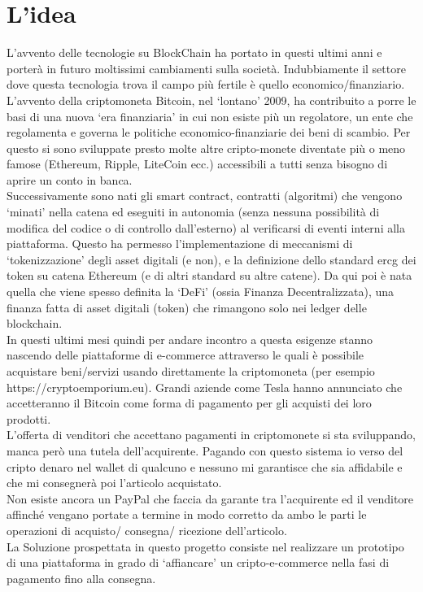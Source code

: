 \section{L'idea}
L’avvento delle tecnologie su BlockChain ha portato in questi ultimi anni e porterà in futuro moltissimi cambiamenti sulla società. Indubbiamente il settore dove questa tecnologia trova il campo più fertile è quello economico/finanziario. L’avvento della criptomoneta Bitcoin, nel ‘lontano’ 2009, ha contribuito a porre le basi di una nuova ‘era finanziaria’ in cui non esiste più un regolatore, un ente che regolamenta e governa le politiche economico-finanziarie dei beni di scambio. Per questo si sono sviluppate presto molte altre cripto-monete diventate più o meno famose (Ethereum, Ripple, LiteCoin ecc.) accessibili a tutti senza bisogno di aprire un conto in banca.\\
Successivamente sono nati gli smart contract, contratti (algoritmi) che vengono ‘minati’ nella catena ed eseguiti in autonomia (senza nessuna possibilità di modifica del codice o di controllo dall’esterno) al verificarsi di eventi interni alla piattaforma. Questo ha permesso l’implementazione di meccanismi di ‘tokenizzazione’ degli asset digitali (e non), e la definizione dello standard \gls{ercg} dei token su catena Ethereum (e di altri standard su altre catene). Da qui poi è nata quella che viene spesso definita la ‘DeFi’ (ossia Finanza Decentralizzata), una finanza fatta di asset digitali (token) che rimangono solo nei ledger delle blockchain.\\
In questi ultimi mesi quindi per andare incontro a questa esigenze stanno nascendo delle piattaforme di e-commerce attraverso le quali è possibile acquistare beni/servizi usando direttamente la criptomoneta (per esempio https://cryptoemporium.eu). Grandi aziende come Tesla hanno annunciato che accetteranno il Bitcoin come forma di pagamento per gli acquisti dei loro prodotti.\\
L’offerta di venditori che accettano pagamenti in criptomonete si sta sviluppando, manca però una tutela dell’acquirente. Pagando con questo sistema io verso del cripto denaro nel wallet di qualcuno e nessuno mi garantisce che sia affidabile e che mi consegnerà poi l’articolo acquistato.\\
Non esiste ancora un PayPal che faccia da garante tra l’acquirente ed il venditore affinché vengano portate a termine in modo corretto da ambo le parti le operazioni di acquisto/ consegna/ ricezione dell’articolo.\\
La Soluzione prospettata in questo progetto consiste nel realizzare un prototipo di una piattaforma in grado di ‘affiancare’ un cripto-e-commerce nella fasi di pagamento fino alla consegna.\\
